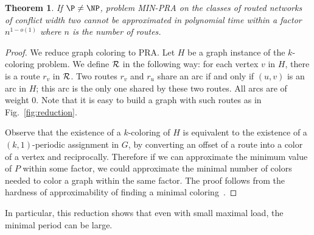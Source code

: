 \documentclass[10pt, conference, letterpaper]{IEEEtran}
\newtheorem{theorem}{Theorem}
\begin{document}
\begin{theorem}\label{th:inapprox}
If $\P \neq \NP$, problem MIN-PRA on the classes of routed networks of conflict width two cannot be approximated in polynomial time within a factor $n^{1-o(1)}$ where $n$ is the number of routes.
\end{theorem}

\begin{proof}
 We reduce graph coloring to PRA. Let $H$ be a graph instance of the $k$-coloring problem. 
 We define ${\cal R}$ in the following way: for each vertex $v$ in $H$, there is a route $r_v$ in ${\cal R}$.
 Two routes $r_v$ and $r_u$ share an arc if and only if $(u,v)$ is an arc in $H$; this arc is the only one shared by these two routes. All arcs are of weight $0$. Note that it is easy to build a graph with such routes as in Fig.~\ref{fig:reduction}.
 
 Observe that the existence of a $k$-coloring of $H$ is equivalent to the existence of a $(k,1)$-periodic assignment in $G$, 
 by converting an offset of a route into a color of a vertex and reciprocally. Therefore if we can approximate the minimum value of $P$ within some factor, we could approximate the minimal number of colors needed to color a graph within the same factor. The proof follows from the hardness of approximability of finding a minimal coloring~\cite{zuckerman2006linear}.
\end{proof}


In particular, this reduction shows that even with small maximal load, the minimal period can be large.
\end{document}
